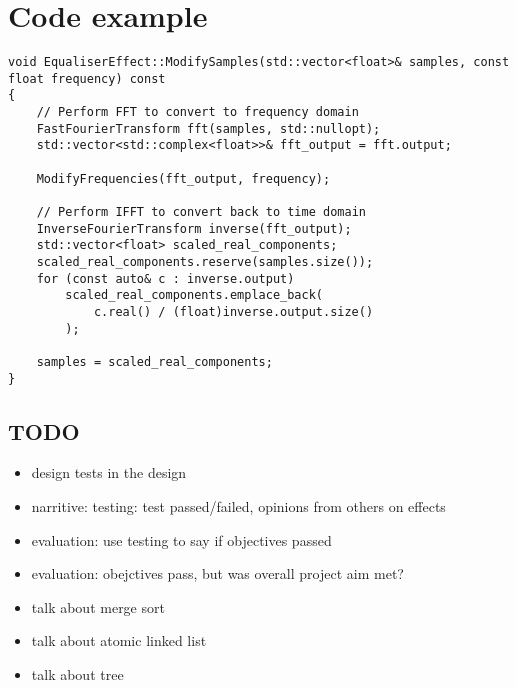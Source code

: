 \documentclass{article}
\begin{document}
	\section { Code example }
		\begin{verbatim}
void EqualiserEffect::ModifySamples(std::vector<float>& samples, const float frequency) const
{
	// Perform FFT to convert to frequency domain
	FastFourierTransform fft(samples, std::nullopt);
	std::vector<std::complex<float>>& fft_output = fft.output;

	ModifyFrequencies(fft_output, frequency);

	// Perform IFFT to convert back to time domain
	InverseFourierTransform inverse(fft_output);
	std::vector<float> scaled_real_components;
	scaled_real_components.reserve(samples.size());
	for (const auto& c : inverse.output)
		scaled_real_components.emplace_back(
			c.real() / (float)inverse.output.size()
		);

	samples = scaled_real_components;
}
	\end{verbatim}
	
	\subsection{TODO}
	\begin{itemize}
		\item design tests in the design
		\item narritive: testing: test passed/failed, opinions from others on effects
		\item evaluation: use testing to say if objectives passed
		\item evaluation: obejctives pass, but was overall project aim met?
		\item talk about merge sort
		\item talk about atomic linked list
		\item talk about tree
	\end{itemize}
	
\end{document}
